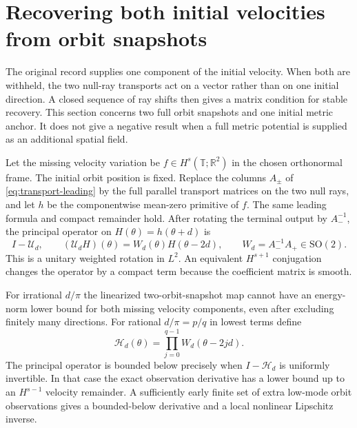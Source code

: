 \section{Recovering both initial velocities from orbit snapshots}
\label{sec:both-velocities}
The original record supplies one component of the
initial velocity. When both are withheld, the two
null-ray transports act on a vector rather than on
one initial direction. A closed sequence of ray shifts
then gives a matrix condition for stable recovery.
This section concerns two full orbit snapshots and one
initial metric anchor. It does not give a negative
result when a full metric potential is supplied as an
additional spatial field.

Let the missing velocity variation be
$f\in H^s(\mathbb T;\mathbb R^2)$ in the chosen
orthonormal frame. The initial orbit position is fixed.
Replace the columns $A_\pm$ of
\eqref{eq:transport-leading} by the full parallel
transport matrices on the two null rays, and let $h$
be the componentwise mean-zero primitive of $f$.
The same leading formula and compact remainder hold.
After rotating the terminal output by $A_-^{-1}$,
the principal operator on $H(\theta)=h(\theta+d)$ is
\[
 I-\mathcal U_d,\qquad
 (\mathcal U_d H)(\theta)
  =W_d(\theta)H(\theta-2d),\qquad
 W_d=A_-^{-1}A_+\in \mathrm{SO}(2).
\]
This is a unitary weighted rotation in $L^2$.
An equivalent $H^{s+1}$ conjugation changes the
operator by a compact term because the coefficient
matrix is smooth.

\begin{proposition}
\label{prop:both-ray-holonomy}
For irrational $d/\pi$ the linearized two-orbit-snapshot
map cannot have an energy-norm lower bound for both
missing velocity components, even after excluding
finitely many directions.
For rational $d/\pi=p/q$ in lowest terms define
\[
 \mathcal H_d(\theta)=
     \prod_{j=0}^{q-1} W_d(\theta-2jd) .
\]
The principal operator is bounded below precisely when
$I-\mathcal H_d$ is uniformly invertible.
In that case the exact observation derivative has a
lower bound up to an $H^{s-1}$ velocity remainder.
A sufficiently early finite set of extra low-mode
orbit observations gives a bounded-below derivative
and a local nonlinear Lipschitz inverse.
\end{proposition}

